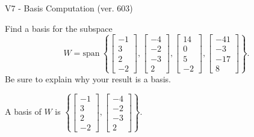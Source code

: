 \begin{exercise}
  \begin{exerciseTitle}V7 - Basis Computation (ver. 603)\end{exerciseTitle}
  \begin{exerciseStatement}
    Find a basis for the subspace 
\[W=\mathrm{span}\ \left\{\left[\begin{array}{r}
-1 \\
3 \\
2 \\
-2
\end{array}\right] , \left[\begin{array}{r}
-4 \\
-2 \\
-3 \\
2
\end{array}\right] , \left[\begin{array}{r}
14 \\
0 \\
5 \\
-2
\end{array}\right] , \left[\begin{array}{r}
-41 \\
-3 \\
-17 \\
8
\end{array}\right]\right\}.\]
 Be sure to explain why your result is a basis.


  \end{exerciseStatement}
  \begin{exerciseAnswer}
   A basis of \(W\) is  \(\left\{\left[\begin{array}{r}
-1 \\
3 \\
2 \\
-2
\end{array}\right] , \left[\begin{array}{r}
-4 \\
-2 \\
-3 \\
2
\end{array}\right]\right\}\).
  


  \end{exerciseAnswer}
\end{exercise}